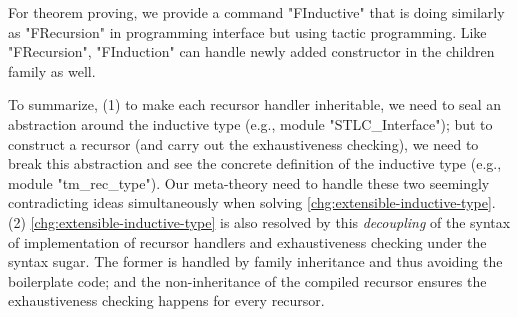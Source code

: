  









For theorem proving, we provide a command "FInductive" that is doing similarly as "FRecursion" in programming interface but using tactic programming. Like "FRecursion", "FInduction" can handle newly added constructor in the children family as well.


To summarize, (1) to make each recursor
handler inheritable, we need to seal an abstraction around the inductive
type (e.g., module "STLC_Interface"); but to construct a recursor (and carry out the
exhaustiveness checking), we need to break this abstraction and see the
concrete definition of the inductive type (e.g., module "tm_rec_type"). Our
meta-theory need to handle these two seemingly contradicting ideas
simultaneously when solving \ref{chg:extensible-inductive-type}.
(2) \ref{chg:extensible-inductive-type} is also resolved by this
\textit{decoupling} of the syntax of implementation of recursor handlers
and exhaustiveness checking under the syntax sugar. 
The former is handled by family inheritance
and thus avoiding the boilerplate code; and the non-inheritance of the
compiled recursor ensures the exhaustiveness checking happens for every
recursor.  



